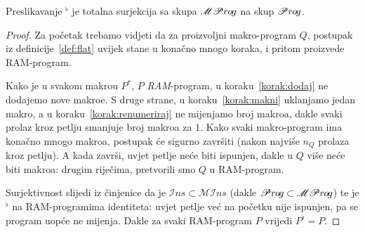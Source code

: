 \begin{propozicija}[{name=[spljoštenje projicira $\mathscr{MP}r\mspace{-1mu}o\mspace{-2mu}g$ na $\mathscr Pr\mspace{-1mu}o\mspace{-2mu}g$]}]
	Preslikavanje ${}^\flat$ je totalna surjekcija sa skupa $\mathscr{MP}r\mspace{-1mu}o\mspace{-2mu}g$ na skup $\mathscr Pr\mspace{-1mu}o\mspace{-2mu}g$.
\end{propozicija}
\begin{proof}
Za početak trebamo vidjeti da za proizvoljni makro-program $Q$, postupak iz definicije~\ref{def:flat} uvijek stane u konačno mnogo koraka, i pritom proizvede RAM-program.

Kako je u svakom makrou $P^*$, $P$ \emph{RAM}-program, u koraku~\ref{korak:dodaj} ne dodajemo nove makroe. S druge strane, u koraku~\ref{korak:makni} uklanjamo jedan makro, a u koraku~\ref{korak:renumeriraj} ne mijenjamo broj makroa, dakle svaki prolaz kroz petlju smanjuje broj makroa za $1$. Kako svaki makro-program ima konačno mnogo makroa, postupak će sigurno završiti (nakon najviše $n_Q$ prolaza kroz petlju). A kada završi, uvjet petlje neće biti ispunjen, dakle u $Q$ više neće biti makroa: drugim riječima, pretvorili smo  $Q$ u RAM-program.

	Surjektivnost slijedi iz činjenice da je $\mathscr Ins\subset\mathscr{MI}ns$ (dakle $\mathscr Pr\mspace{-1mu}o\mspace{-2mu}g\subset\mathscr{MP}r\mspace{-1mu}o\mspace{-2mu}g$) te je ${}^\flat$ na RAM-programima identiteta: uvjet petlje već na početku nije ispunjen, pa se program uopće ne mijenja. Dakle za svaki RAM-program $P$ vrijedi $P^\flat=P$.
\end{proof}

